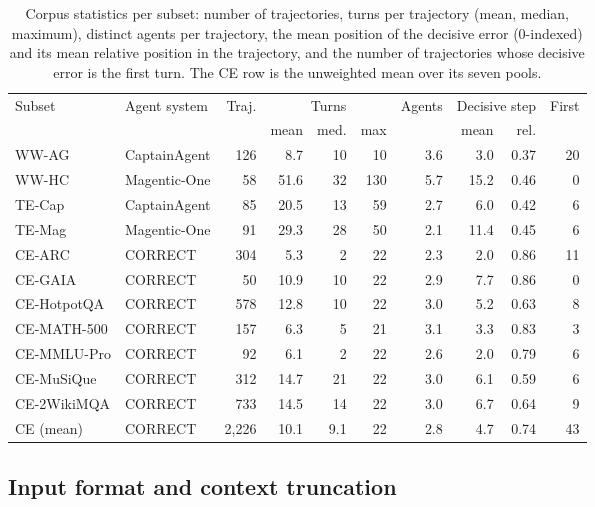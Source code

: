 \begin{table}[h]
\centering
\small
\setlength{\tabcolsep}{4.5pt}
\caption{Corpus statistics per subset: number of trajectories, turns per trajectory
(mean, median, maximum), distinct agents per trajectory, the mean position of the
decisive error (0-indexed) and its mean relative position in the trajectory, and the
number of trajectories whose decisive error is the first turn. The CE row is the
unweighted mean over its seven pools.}
\label{tab:datasets}
\begin{tabular}{l l r rrr r rr r}
\toprule
Subset & Agent system & Traj. & \multicolumn{3}{c}{Turns} & Agents & \multicolumn{2}{c}{Decisive step} & First \\
\cmidrule(lr){4-6}\cmidrule(lr){8-9}
 & & & mean & med. & max & & mean & rel. & \\
\midrule
WW-AG  & CaptainAgent & 126 & 8.7  & 10 & 10  & 3.6 & 3.0  & 0.37 & 20 \\
WW-HC  & Magentic-One & 58  & 51.6 & 32 & 130 & 5.7 & 15.2 & 0.46 & 0 \\
TE-Cap & CaptainAgent & 85  & 20.5 & 13 & 59  & 2.7 & 6.0  & 0.42 & 6 \\
TE-Mag & Magentic-One & 91  & 29.3 & 28 & 50  & 2.1 & 11.4 & 0.45 & 6 \\
\addlinespace[2pt]
CE-ARC      & CORRECT & 304 & 5.3  & 2  & 22 & 2.3 & 2.0 & 0.86 & 11 \\
CE-GAIA     & CORRECT & 50  & 10.9 & 10 & 22 & 2.9 & 7.7 & 0.86 & 0 \\
CE-HotpotQA & CORRECT & 578 & 12.8 & 10 & 22 & 3.0 & 5.2 & 0.63 & 8 \\
CE-MATH-500 & CORRECT & 157 & 6.3  & 5  & 21 & 3.1 & 3.3 & 0.83 & 3 \\
CE-MMLU-Pro & CORRECT & 92  & 6.1  & 2  & 22 & 2.6 & 2.0 & 0.79 & 6 \\
CE-MuSiQue  & CORRECT & 312 & 14.7 & 21 & 22 & 3.0 & 6.1 & 0.59 & 6 \\
CE-2WikiMQA & CORRECT & 733 & 14.5 & 14 & 22 & 3.0 & 6.7 & 0.64 & 9 \\
\rowcolor{Gray}
CE (mean)   & CORRECT & 2{,}226 & 10.1 & 9.1 & 22 & 2.8 & 4.7 & 0.74 & 43 \\
\bottomrule
\end{tabular}
\end{table}

\subsection{Input format and context truncation}
\label{app:input}

